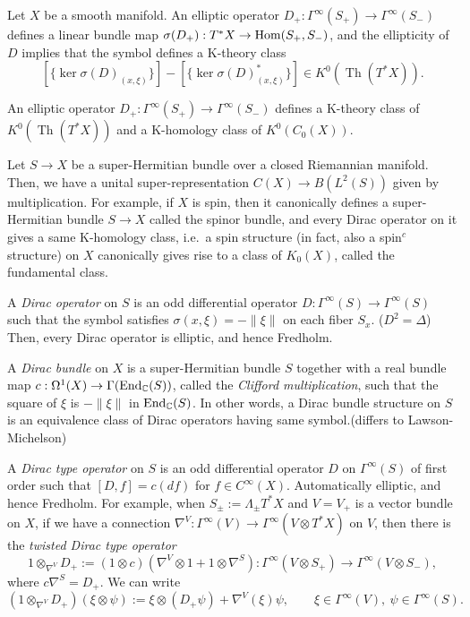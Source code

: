 \documentclass{../../large}
\begin{document}
\begin{prb}[]
Let $X$ be a smooth manifold.
An elliptic operator $D_+:\Gamma^\infty(S_+)\to\Gamma^\infty(S_-)$ defines a linear bundle map $\sigma(D_+):T^*X\to\operatorname{Hom}(S_+,S_-)$, and the ellipticity of $D$ implies that the symbol defines a K-theory class
\[[\{\ker\sigma(D)_{(x,\xi)}\}]-[\{\ker\sigma(D)^*_{(x,\xi)}\}]\in K^0(\operatorname{Th}(T^*X)).\]

An elliptic operator $D_+:\Gamma^\infty(S_+)\to\Gamma^\infty(S_-)$ defines a K-theory class of $K^0(\operatorname{Th}(T^*X))$ and a K-homology class of $K^0(C_0(X))$.



\end{prb}




Let $S\to X$ be a super-Hermitian bundle over a closed Riemannian manifold.
Then, we have a unital super-representation $C(X)\to B(L^2(S))$ given by multiplication.
For example, if $X$ is spin, then it canonically defines a super-Hermitian bundle $S\to X$ called the spinor bundle, and every Dirac operator on it gives a same K-homology class, i.e.~a spin structure (in fact, also a spin$^c$ structure) on $X$ canonically gives rise to a class of $K_0(X)$, called the fundamental class.

A \emph{Dirac operator} on $S$ is an odd differential operator $D:\Gamma^\infty(S)\to\Gamma^\infty(S)$ such that the symbol satisfies $\sigma(x,\xi)=-\|\xi\|$ on each fiber $S_x$. ($D^2=\Delta$)
Then, every Dirac operator is elliptic, and hence Fredholm.

A \emph{Dirac bundle} on $X$ is a super-Hermitian bundle $S$ together with a real bundle map $c:\Omega^1(X)\to\Gamma(\operatorname{End}_{\mathbb{C}}(S))$, called the \emph{Clifford multiplication}, such that the square of $\xi$ is $-\|\xi\|$ in $\operatorname{End}_{\mathbb{C}}(S)$.
In other words, a Dirac bundle structure on $S$ is an equivalence class of Dirac operators having same symbol.(differs to Lawson-Michelson)


A \emph{Dirac type operator} on $S$ is an odd differential operator $D$ on $\Gamma^\infty(S)$ of first order such that $[D,f]=c(df)$ for $f\in C^\infty(X)$.
Automatically elliptic, and hence Fredholm.
For example, when $S_\pm:=\Lambda_\pm T^*X$ and $V=V_+$ is a vector bundle on $X$, if we have a connection $\nabla^V:\Gamma^\infty(V)\to\Gamma^\infty(V\otimes T^*X)$ on $V$, then there is the \emph{twisted Dirac type operator}
\[1\otimes_{\nabla^V}D_+:=(1\otimes c)(\nabla^V\otimes1+1\otimes\nabla^S):\Gamma^\infty(V\otimes S_+)\to\Gamma^\infty(V\otimes S_-),\]
where $c\nabla^S=D_+$.
We can write
\[(1\otimes_{\nabla^V}D_+)(\xi\otimes\psi):=\xi\otimes(D_+\psi)+\nabla^V(\xi)\psi,\qquad\xi\in\Gamma^\infty(V),\ \psi\in\Gamma^\infty(S).\]
\end{document}
